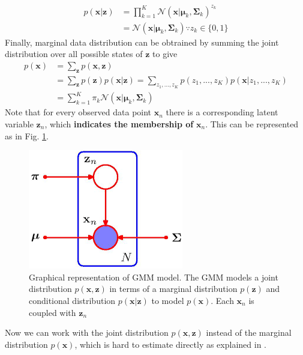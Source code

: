 \begin{align*}
p(\mathbf{x}|\mathbf{z}) &= \prod_{k=1}^{K}\mathcal{N}(\mathbf{x}|\boldsymbol{\mu}_k, \boldsymbol{\Sigma}_k)^{z_k}\\
& = \mathcal{N}(\mathbf{x}|\boldsymbol{\mu}_k, \boldsymbol{\Sigma}_k) \because z_k\in\{
0,1\}
\end{align*}
Finally, marginal data distribution can be obtrained by summing the joint distribution over all possible states of $\mathbf{z}$ to give
\begin{align*}
	p(\mathbf{x}) &  = \sum_{\mathbf{z}} p(\mathbf{x},\mathbf{z})\\
	& = \sum_{\mathbf{z}} p(\mathbf{z})p(\mathbf{x}|\mathbf{z})= \sum_{z_1,...,z_K} p(z_1,...,z_K)p(\mathbf{x}|z_1,...,z_K)\\
	& = \sum_{k=1}^{K}\pi_k \mathcal{N}(\mathbf{x}|\boldsymbol{\mu}_k, \boldsymbol{\Sigma}_k) 
\end{align*}
Note that for every observed data point $\mathbf{x}_n$ there is a corresponding latent variable $\mathbf{z}_n$, which \textbf{indicates the membership of} $\mathbf{x}_n$. This can be represented as in Fig. \ref{fig:gmm}.

\begin{figure}[h]
	\begin{center}			
		\includegraphics[scale=0.4]{./images/generative/gmm.png}
	\end{center}
	\caption{Graphical representation of GMM model. The GMM models a joint distribution $p(\mathbf{x}, \mathbf{z})$ in terms of a marginal distribution $p(\mathbf{z})$ and conditional distribution $p(\mathbf{x}|\mathbf{z})$ to model $p(\mathbf{x})$. Each $\mathbf{x}_n$ is coupled with $\mathbf{z}_n$}
	\label{fig:gmm}
\end{figure}
Now we can work with the joint distribution $p(\mathbf{x,z})$ instead of the marginal distribution $p(\mathbf{x})$, which is hard to estimate directly as explained in . 

